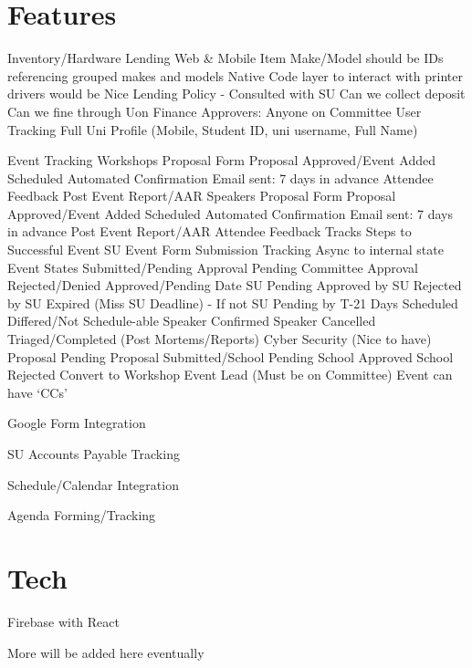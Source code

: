 \documentclass[11pt]{meetingmins}
\begin{document}
\maketitle

\section{Features}
\begin{items}
  \item Inventory/Hardware Lending
    \subitem Web \& Mobile
    \subitem Item Make/Model should be IDs referencing grouped makes and models
    \subitem Native Code layer to interact with printer drivers would be Nice
    \subitem Lending Policy - Consulted with SU
      \subsubitem Can we collect deposit
      \subsubitem Can we fine through Uon Finance
    \subitem Approvers: Anyone on Committee
    \subitem User Tracking
      \subsubitem Full Uni Profile (Mobile, Student ID, uni username, Full Name)
  \item Event Tracking
    \subitem Workshops
      \subsubitem Proposal Form
      \subsubitem Proposal Approved/Event Added
      \subsubitem Scheduled
      \subsubitem Automated Confirmation Email sent: 7 days in advance
      \subsubitem Attendee Feedback
      \subsubitem Post Event Report/AAR
    \subitem Speakers
      \subsubitem Proposal Form
      \subsubitem Proposal Approved/Event Added
      \subsubitem Scheduled
      \subsubitem Automated Confirmation Email sent: 7 days in advance
      \subsubitem Post Event Report/AAR
      \subsubitem Attendee Feedback
    \subitem Tracks Steps to Successful Event
    \subitem SU Event Form Submission Tracking
      \subsubitem Async to internal state
    \subitem Event States
      \subsubitem Submitted/Pending Approval
      \subsubitem Pending Committee Approval
      \subsubitem Rejected/Denied
      \subsubitem Approved/Pending Date
      \subsubitem SU Pending
      \subsubitem Approved by SU
      \subsubitem Rejected by SU
      \subsubitem Expired (Miss SU Deadline) - If not SU Pending by T-21 Days
      \subsubitem Scheduled
      \subsubitem Differed/Not Schedule-able
      \subsubitem Speaker Confirmed
      \subsubitem Speaker Cancelled
      \subsubitem Triaged/Completed (Post Mortems/Reports)
    \subitem Cyber Security (Nice to have)
      \subsubitem Proposal Pending
      \subsubitem Proposal Submitted/School Pending
      \subsubitem School Approved
      \subsubitem School Rejected
      \subsubitem Convert to Workshop
    \subitem Event Lead (Must be on Committee)
    \subitem Event can have `CCs'
  \item Google Form Integration
  \item SU Accounts Payable Tracking
  \item Schedule/Calendar Integration
  \item Agenda Forming/Tracking
\end{items}

\section{Tech}
\begin{items}
  \item Firebase with React
  \item More will be added here eventually
\end{items}

\vspace{1em}
\end{document}
